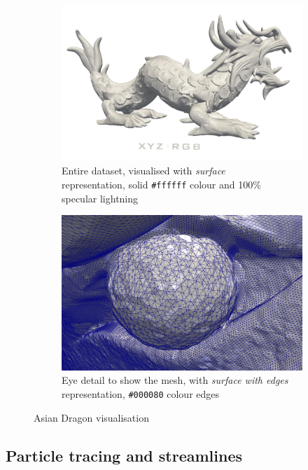 \documentclass[openany]{article}
\begin{document}
\begin{figure}[h]
\centering
\begin{subfigure}{.5\textwidth}
  \centering
  \includegraphics[width=\linewidth]{Asian_Dragon/asian_dragon}
  \caption{Entire dataset, visualised with \textit{surface}  \\
  representation, solid \texttt{\#ffffff} colour and 100\% \\ specular lightning}
\end{subfigure}%
\begin{subfigure}{.5\textwidth}
  \centering
  \includegraphics[width=\linewidth]{Asian_Dragon/eye_detail_edges}
  \caption{Eye detail to show the mesh, with \textit{surface with edges} representation, \texttt{\#000080} colour edges}
\end{subfigure}
\caption{Asian Dragon visualisation}
\end{figure}

\subsection {Particle tracing and streamlines}
\end{document}
